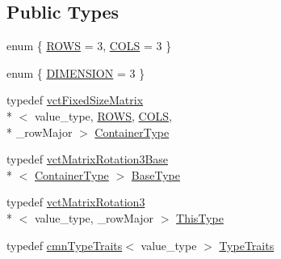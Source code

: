 \subsection*{Public Types}
\begin{DoxyCompactItemize}
\item 
enum \{ \hyperlink{classvct_matrix_rotation3_ac08ca99a9ddb4e59a896f765b4ae95bfa2e2c8802539f04eff93b4598b1fbb362}{R\-O\-W\-S} = 3, 
\hyperlink{classvct_matrix_rotation3_ac08ca99a9ddb4e59a896f765b4ae95bfa8c935a63b595f6c48177e1213c36f787}{C\-O\-L\-S} = 3
 \}
\item 
enum \{ \hyperlink{classvct_matrix_rotation3_aa21ad8fcafb1ab9d70efcec9bda6eab2af25ebbcafe4db62f894c21db0608cd65}{D\-I\-M\-E\-N\-S\-I\-O\-N} = 3
 \}
\item 
typedef \hyperlink{classvct_fixed_size_matrix}{vct\-Fixed\-Size\-Matrix}\\*
$<$ value\-\_\-type, \hyperlink{classvct_matrix_rotation3_ac08ca99a9ddb4e59a896f765b4ae95bfa2e2c8802539f04eff93b4598b1fbb362}{R\-O\-W\-S}, \hyperlink{classvct_matrix_rotation3_ac08ca99a9ddb4e59a896f765b4ae95bfa8c935a63b595f6c48177e1213c36f787}{C\-O\-L\-S}, \\*
\-\_\-row\-Major $>$ \hyperlink{classvct_matrix_rotation3_a1f8796d5368dbda35c3b57c6395b6dd0}{Container\-Type}
\item 
typedef \hyperlink{classvct_matrix_rotation3_base}{vct\-Matrix\-Rotation3\-Base}\\*
$<$ \hyperlink{classvct_matrix_rotation3_a1f8796d5368dbda35c3b57c6395b6dd0}{Container\-Type} $>$ \hyperlink{classvct_matrix_rotation3_a548c9a746fae0bfb7b4b1466a872f4dd}{Base\-Type}
\item 
typedef \hyperlink{classvct_matrix_rotation3}{vct\-Matrix\-Rotation3}\\*
$<$ value\-\_\-type, \-\_\-row\-Major $>$ \hyperlink{classvct_matrix_rotation3_adb3687819aa485dec149239047be7c50}{This\-Type}
\item 
typedef \hyperlink{classcmn_type_traits}{cmn\-Type\-Traits}$<$ value\-\_\-type $>$ \hyperlink{classvct_matrix_rotation3_a17e78ff6b4b66abf1f301c136652e503}{Type\-Traits}
\end{DoxyCompactItemize}

